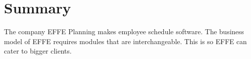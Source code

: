 \chapter{Summary}

The company EFFE Planning makes employee schedule software. The business model of EFFE requires modules that are interchangeable. This is so EFFE can cater to bigger clients.

